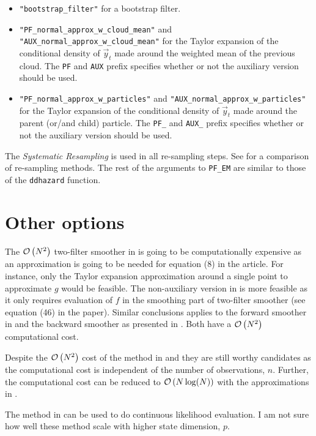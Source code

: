 \begin{itemize}
	\item \verb|"bootstrap_filter"| for a bootstrap filter.
	\item \verb|"PF_normal_approx_w_cloud_mean"| and \verb|"AUX_normal_approx_w_cloud_mean"| for the Taylor expansion of the conditional density of $\vec{y}_t$ made around the weighted mean of the previous cloud. The \verb|PF| and \verb|AUX| prefix specifies whether or not the auxiliary version should be used.
	\item \verb|"PF_normal_approx_w_particles"| and \verb|"AUX_normal_approx_w_particles"| for the Taylor expansion of the conditional density of $\vec{y}_t$ made around the parent (or/and child) particle. The \verb|PF_| and \verb|AUX_| prefix specifies whether or not the auxiliary version should be used.
\end{itemize}

The \emph{Systematic Resampling} \citep{kitagawa96} is used in all re-sampling steps. See \cite{douc05} for a comparison of re-sampling methods. The rest of the arguments to \verb|PF_EM| are similar to those of the \verb|ddhazard| function.

\section{Other options}
The $\mathcal{O}\left( N^2\right)$ two-filter smoother in \cite{fearnhead10} is going to be computationally expensive as an approximation is going to be needed for equation (8) in the article. For instance, only the Taylor expansion approximation around a single point to approximate $g$ would be feasible. The non-auxiliary version in \citet{briers10} is more feasible as it only requires evaluation of $f$ in the smoothing part of two-filter smoother (see equation (46) in the paper). Similar conclusions applies to the forward smoother in \cite{del10} and the backward smoother as presented in \cite{kantas15}. Both have a $\mathcal{O}\left( N^2\right)$ computational cost.

Despite the $\mathcal{O}\left( N^2\right)$ cost of the method in \citet{briers10} and \cite{del10} they are still worthy candidates as the computational cost is independent of the number of observations, $n$.  Further, the computational cost can be reduced to $\mathcal{O}\left( N\log(N)\right)$ with the approximations in \cite{klaas06}.

The method in \citet[see particularly section 6.2 on page 203]{malik11} can be used to do continuous likelihood evaluation. I am not sure how well these method scale with higher state dimension, $p$.

